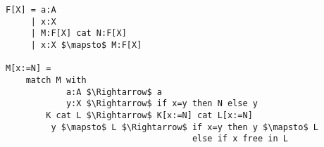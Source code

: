 \begin{lstlisting}[language=Sava,mathescape]
F[X] = a:A 
     | x:X
     | M:F[X] cat N:F[X]
     | x:X $\mapsto$ M:F[X]

M[x:=N] =
    match M with 
            a:A $\Rightarrow$ a
            y:X $\Rightarrow$ if x=y then N else y
        K cat L $\Rightarrow$ K[x:=N] cat L[x:=N]
         y $\mapsto$ L $\Rightarrow$ if x=y then y $\mapsto$ L 
                                     else if x free in L 
\end{lstlisting}


